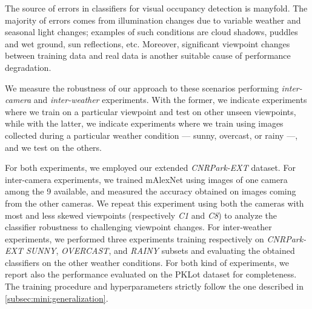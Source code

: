 The source of errors in classifiers for visual occupancy detection is manyfold.
The majority of errors comes from illumination changes due to variable weather and seasonal light changes;
examples of such conditions are cloud shadows, puddles and wet ground, sun reflections, etc.
Moreover, significant viewpoint changes between training data and real data is another suitable cause of performance degradation.

We measure the robustness of our approach to these scenarios performing \emph{inter-camera} and \emph{inter-weather} experiments.
With the former, we indicate experiments where we train on a particular viewpoint and test on other unseen viewpoints, while with the latter, we indicate experiments where we train using images collected during a particular weather condition --- sunny, overcast, or rainy ---, and we test on the others.

For both experiments, we employed our extended \emph{CNRPark-EXT} dataset.
For inter-camera experiments, we trained mAlexNet using images of one camera among the 9 available, and measured the accuracy obtained on images coming from the other cameras.
We repeat this experiment using both the cameras with most and less skewed viewpoints (respectively \emph{C1} and \emph{C8}) to analyze the classifier robustness to challenging viewpoint changes.
For inter-weather experiments, we performed three experiments training respectively on \emph{CNRPark-EXT SUNNY}, \emph{OVERCAST}, and \emph{RAINY} subsets and evaluating the obtained classifiers on the other weather conditions.
For both kind of experiments, we report also the performance evaluated on the PKLot dataset for completeness.
The training procedure and hyperparameters strictly follow the one described in \ref{subsec:mini:generalization}.

